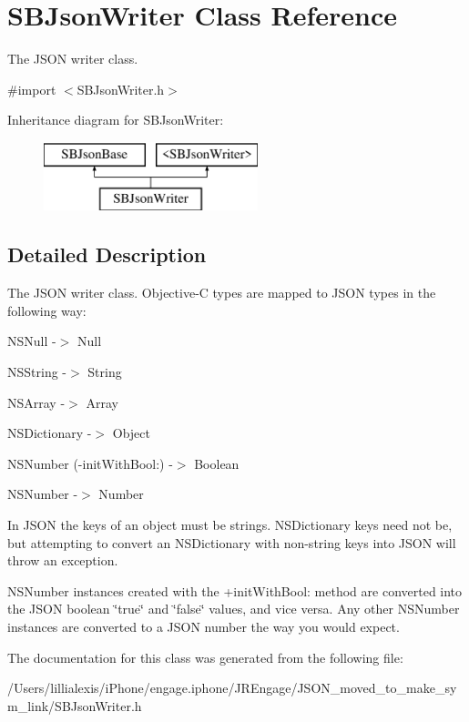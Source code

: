 \hypertarget{interface_s_b_json_writer}{
\section{SBJsonWriter Class Reference}
\label{interface_s_b_json_writer}
}


The JSON writer class.  




{\ttfamily \#import $<$SBJsonWriter.h$>$}

Inheritance diagram for SBJsonWriter:\begin{figure}[H]
\begin{center}
\leavevmode
\includegraphics[height=2.000000cm]{interface_s_b_json_writer}
\end{center}
\end{figure}


\subsection{Detailed Description}
The JSON writer class. Objective-\/C types are mapped to JSON types in the following way:

\begin{DoxyItemize}
\item NSNull -\/$>$ Null \item NSString -\/$>$ String \item NSArray -\/$>$ Array \item NSDictionary -\/$>$ Object \item NSNumber (-\/initWithBool:) -\/$>$ Boolean \item NSNumber -\/$>$ Number\end{DoxyItemize}
In JSON the keys of an object must be strings. NSDictionary keys need not be, but attempting to convert an NSDictionary with non-\/string keys into JSON will throw an exception.

NSNumber instances created with the +initWithBool: method are converted into the JSON boolean \char`\"{}true\char`\"{} and \char`\"{}false\char`\"{} values, and vice versa. Any other NSNumber instances are converted to a JSON number the way you would expect. 

The documentation for this class was generated from the following file:\begin{DoxyCompactItemize}
\item 
/Users/lillialexis/iPhone/engage.iphone/JREngage/JSON\_\-moved\_\-to\_\-make\_\-sym\_\-link/SBJsonWriter.h\end{DoxyCompactItemize}
